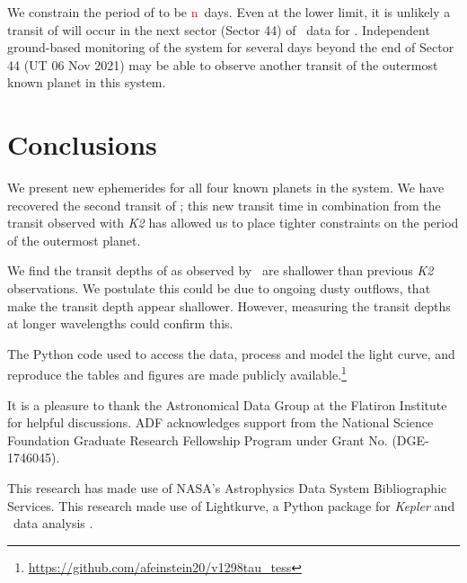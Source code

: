 \documentclass[twocolumn]{aastex631}
\begin{document}
We constrain the period of \planete to be \textcolor{red}{n}~days. Even at the lower limit, it is unlikely a transit of \planete will occur in the next sector (Sector 44) of \tess\ data for \sname. Independent ground-based monitoring of the system for several days beyond the end of Sector 44 (UT 06 Nov 2021) may be able to observe another transit of the outermost known planet in this system.



\section{Conclusions} \label{sec:conclusions}

We present new ephemerides for all four known planets in the \sname system. We have recovered the second transit of \planete; this new transit time in combination from the transit observed with \textit{K2} has allowed us to place tighter constraints on the period of the outermost planet.

We find the transit depths of \allplanets as observed by \tess\ are shallower than previous \textit{K2} observations. We postulate this could be due to ongoing dusty outflows, that make the transit depth appear shallower. However, measuring the transit depths at longer wavelengths could confirm this.


The Python code used to access the data, process and model the light curve, and reproduce the tables and figures are made publicly available.\footnote{\url{https://github.com/afeinstein20/v1298tau_tess}}


\begin{acknowledgments}
It is a pleasure to thank the Astronomical Data Group at the Flatiron Institute for helpful discussions. ADF acknowledges support from the National Science Foundation Graduate Research Fellowship Program under Grant No. (DGE-1746045).

This research has made use of NASA's Astrophysics Data System Bibliographic Services. This research made use of Lightkurve, a Python package for \textit{Kepler} and \tess\ data analysis \citep{lightkurve}.

\end{acknowledgments}
\end{document}
